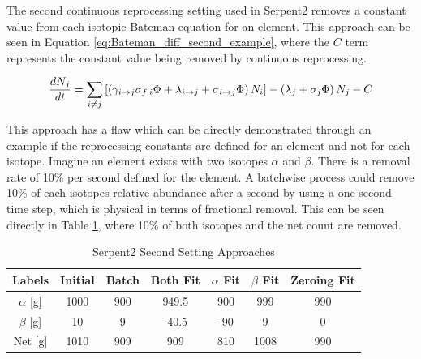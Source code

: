 
The second continuous reprocessing setting used in Serpent2 removes a constant value from each isotopic Bateman equation for an element. This approach can be seen in Equation \ref{eq:Bateman_diff_second_example}, where the $C$ term represents the constant value being removed by continuous reprocessing.

\begin{equation} \hfill
\frac{dN_j}{dt} = \sum_{i \neq j} \left [ \left( \gamma_{i \rightarrow j} \sigma_{f, i} \Phi + \lambda _{i \rightarrow j} + \sigma_{i \rightarrow j} \Phi \right) N_i \right ] - \left ( \lambda_j + \sigma_j \Phi \right ) N_j - C
\hfill\label{eq:Bateman_diff_second_example} \end{equation}

This approach has a flaw which can be directly demonstrated through an example if the reprocessing constants are defined for an element and not for each isotope. Imagine an element exists with two isotopes $\alpha$ and $\beta$. There is a removal rate of 10\% per second defined for the element. A batchwise process could remove 10\% of each isotopes relative abundance after a second by using a one second time step, which is physical in terms of fractional removal. This can be seen directly in Table \ref{tab:cont_repr_appr}, where 10\% of both isotopes and the net count are removed.

\begin{table}[ht]
\renewcommand{\arraystretch}{1.25}
\caption{Serpent2 Second Setting Approaches}
\label{tab:cont_repr_appr}
\begin{center}
\begin{tabular}{ | c | c | c | c | c | c | c |}
 \hline
 Labels & Initial & Batch & Both Fit & $\alpha$ Fit & $\beta$ Fit & Zeroing Fit\\
 \hline
 \hline
$\alpha$ [g] & 1000 & 900 & 949.5 & 900 & 999 & 990\\
$\beta$ [g] & 10 & 9 & -40.5 & -90 & 9 & 0\\
 \hline
 Net [g] & 1010 & 909 & 909 & 810 & 1008 & 990 \\
 \hline
\end{tabular}
\end{center}
\end{table}

